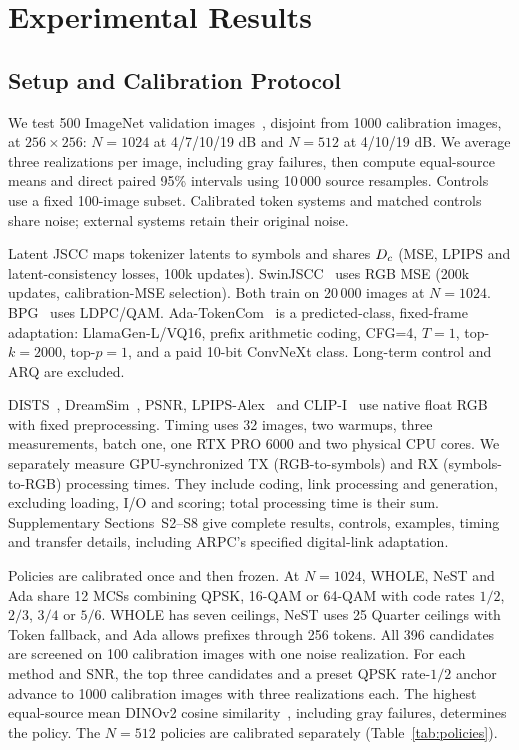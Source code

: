 \section{Experimental Results}
\ifCLASSOPTIONonecolumn\fi
\subsection{Setup and Calibration Protocol}
We test 500 ImageNet validation images~\cite{imagenet}, disjoint from 1000 calibration images, at $256\times256$: $N=1024$ at 4/7/10/19 dB and $N=512$ at 4/10/19 dB. We average three realizations per image, including gray failures, then compute equal-source means and direct paired 95\% intervals using 10\,000 source resamples. Controls use a fixed 100-image subset. Calibrated token systems and matched controls share noise; external systems retain their original noise.

Latent JSCC maps tokenizer latents to symbols and shares $D_c$ (MSE, LPIPS and latent-consistency losses, 100k updates). SwinJSCC~\cite{swinjscc} uses RGB MSE (200k updates, calibration-MSE selection). Both train on 20\,000 images at $N=1024$. BPG~\cite{bpg} uses LDPC/QAM. Ada-TokenCom~\cite{adatokencom} is a predicted-class, fixed-frame adaptation: LlamaGen-L/VQ16, prefix arithmetic coding, CFG=4, $T=1$, top-$k=2000$, top-$p=1$, and a paid 10-bit ConvNeXt class. Long-term control and ARQ are excluded.

DISTS~\cite{dists}, DreamSim~\cite{dreamsim}, PSNR, LPIPS-Alex~\cite{lpips} and CLIP-I~\cite{clip} use native float RGB with fixed preprocessing. Timing uses 32 images, two warmups, three measurements, batch one, one RTX PRO 6000 and two physical CPU cores. We separately measure GPU-synchronized TX (RGB-to-symbols) and RX (symbols-to-RGB) processing times. They include coding, link processing and generation, excluding loading, I/O and scoring; total processing time is their sum. Supplementary Sections~S2--S8 give complete results, controls, examples, timing and transfer details, including ARPC's specified digital-link adaptation.

Policies are calibrated once and then frozen. At $N=1024$, WHOLE, NeST and Ada share 12 MCSs combining QPSK, 16-QAM or 64-QAM with code rates $1/2$, $2/3$, $3/4$ or $5/6$. WHOLE has seven ceilings, NeST uses 25 Quarter ceilings with Token fallback, and Ada allows prefixes through 256 tokens. All 396 candidates are screened on 100 calibration images with one noise realization. For each method and SNR, the top three candidates and a preset QPSK rate-$1/2$ anchor advance to 1000 calibration images with three realizations each. The highest equal-source mean DINOv2 cosine similarity~\cite{dinov2}, including gray failures, determines the policy. The $N=512$ policies are calibrated separately (Table~\ref{tab:policies}).

